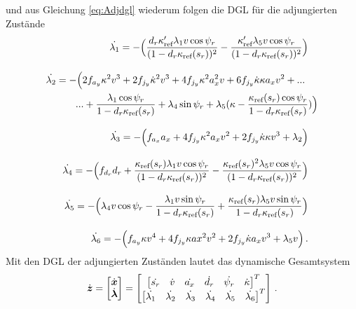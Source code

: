 und aus Gleichung \eqref{eq:Adjdgl} wiederum folgen die \gls{DGL} für die adjungierten Zustände
\begin{align}
	\begin{split}
		\dot{\lambda_1} &= -\Big(\frac{d_r\kappa'_{\textrm{ref}}\lambda_1v\cos{\psi_r}}{(1-d_r\kappa_{\textrm{ref}}(s_r))^2} - \frac{\kappa'_{\textrm{ref}}\lambda_5v\cos{\psi_r}}{(1-d_r\kappa_{\textrm{ref}}(s_r))^2}\Big)
	\end{split} \label{eq:dlambda1}
	\\[2ex]
	\begin{split}
		\dot{\lambda_2} &= -\Big(2f_{a_y} \kappa^2v^3 + 2f_{j_y}\dot{\kappa}^2v^3 + 4f_{j_y}\kappa^2a_x^2v + 6f_{j_y}\dot{\kappa}\kappa a_xv^2 + ...\\
		&\qquad ... + \frac{\lambda_1\cos{\psi_r}}{1-d_r\kappa_{\textrm{ref}}(s_r)} + \lambda_4\sin{\psi_r} + \lambda_5(\kappa - \frac{\kappa_{\textrm{ref}}(s_r) \cos{\psi_r}}{1-d_r\kappa_{\textrm{ref}}(s_r)})\Big)
	\end{split} \label{eq:dlambda2}
	\\[2ex]
	\begin{split}
		\dot{\lambda_3} &= -\Big(f_{a_x} a_x + 4f_{j_y}\kappa^2a_xv^2 + 2f_{j_y}\dot{\kappa}\kappa v^3 + \lambda_2 \Big)
	\end{split} \label{eq:dlambda3}
	\\[2ex]
	\begin{split}
		\dot{\lambda_4} &= -\Big(f_{d_r} d_r + \frac{\kappa_{\textrm{ref}}(s_r)\lambda_1v\cos{\psi_r}}{(1-d_r\kappa_{\textrm{ref}}(s_r))^2} -\frac{\kappa_{\textrm{ref}}(s_r)^2\lambda_5v\cos{\psi_r}}{(1-d_r\kappa_{\textrm{ref}}(s_r))^2} \Big)
	\end{split} \label{eq:dlambda4}
	\\[2ex]
	\begin{split}
		\dot{\lambda_5} &= -\Big(\lambda_4v\cos{\psi_r} - \frac{\lambda_1v\sin{\psi_r}}{1-d_r\kappa_{\textrm{ref}}(s_r)} + \frac{\kappa_{\textrm{ref}}(s_r)\lambda_5v\sin{\psi_r}}{1-d_r\kappa_{\textrm{ref}}(s_r)}\Big)
	\end{split} \label{eq:dlambda5}
	\\[2ex]
	\begin{split}
		\dot{\lambda_6} &= -\Big(f_{a_y}\kappa v^4 + 4f_{j_y}\kappa ax^2v^2 + 2f_{j_y} \dot{\kappa}a_xv^3 + \lambda_5v \Big)\,.
	\end{split} \label{eq:dlambda6}
\end{align}
Mit den \gls{DGL} der adjungierten Zuständen lautet das dynamische Gesamtsystem
\begin{equation}
	\dot{\boldsymbol{z}} = \begin{bmatrix}
	\dot{\boldsymbol{x}} \\
	\dot{\boldsymbol{\lambda}}
	\end{bmatrix} =
	\begin{bmatrix}
		\begin{bmatrix}
		\dot{s_r} & \dot{v} & \dot{a_x} & \dot{d_r} & \dot{\psi_r} & \dot{\kappa}
		\end{bmatrix}^T\\
		\begin{bmatrix}
		\dot{\lambda_1} & \dot{\lambda_2} & \dot{\lambda_3} & \dot{\lambda_4} & \dot{\lambda_5} & \dot{\lambda_6}
		\end{bmatrix}^T
	\end{bmatrix}\,.
\end{equation}
